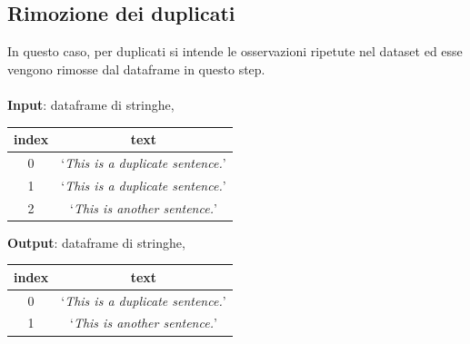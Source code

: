 \documentclass[12pt]{report}
\theoremstyle{definition}
\begin{document}
\subsection{Rimozione dei duplicati}
In questo caso, per duplicati si intende le osservazioni ripetute nel dataset ed esse vengono rimosse dal dataframe in questo step.
\\
\\
\textbf{Input}: dataframe di stringhe,
\begin{center}
    \begin{tabular}{|c|c|}
    \hline
    \textbf{index} & \textbf{text} \\
    \hline
         0 & `\textit{This is a duplicate sentence.}'\\
         1 & `\textit{This is a duplicate sentence.}'\\
         2 & `\textit{This is another sentence.}'\\
    \hline
    \end{tabular}
\end{center}
\textbf{Output}: dataframe di stringhe,
\begin{center}
    \begin{tabular}{|c|c|}
    \hline
    \textbf{index} & \textbf{text} \\
    \hline
         0 & `\textit{This is a duplicate sentence.}'\\
         1 & `\textit{This is another sentence.}'\\
    \hline
    \end{tabular}
\end{center}
\end{document}
